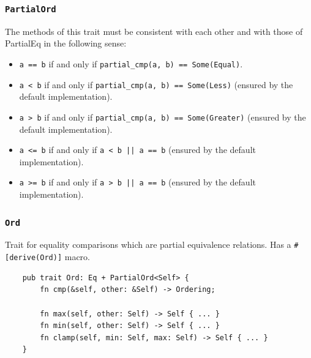 \documentclass[aspectratio=1610,t]{beamer}
\begin{document}

\begin{frame}[fragile]
\frametitle{\texttt{PartialOrd}}
The methods of this trait must be consistent with each other and with those of PartialEq in the following sense:

\begin{itemize}
    \item \texttt{a == b} if and only if \texttt{partial\_cmp(a, b) == Some(Equal)}.
    \item \texttt{a < b} if and only if \texttt{partial\_cmp(a, b) == Some(Less)} (ensured by the default implementation).
    \item \texttt{a > b} if and only if \texttt{partial\_cmp(a, b) == Some(Greater)} (ensured by the default implementation).
    \item \texttt{a <= b} if and only if \texttt{a < b || a == b} (ensured by the default implementation).
    \item \texttt{a >= b} if and only if \texttt{a > b || a == b} (ensured by the default implementation).
\end{itemize}
\end{frame}


\begin{frame}[fragile]
\frametitle{\texttt{Ord}}
Trait for equality comparisons which are partial equivalence relations. Has a \texttt{\#[derive(Ord)]} macro.

\begin{verbatim}
    pub trait Ord: Eq + PartialOrd<Self> {
        fn cmp(&self, other: &Self) -> Ordering;

        fn max(self, other: Self) -> Self { ... }
        fn min(self, other: Self) -> Self { ... }
        fn clamp(self, min: Self, max: Self) -> Self { ... }
    }
\end{verbatim}
\end{frame}

\end{document}
